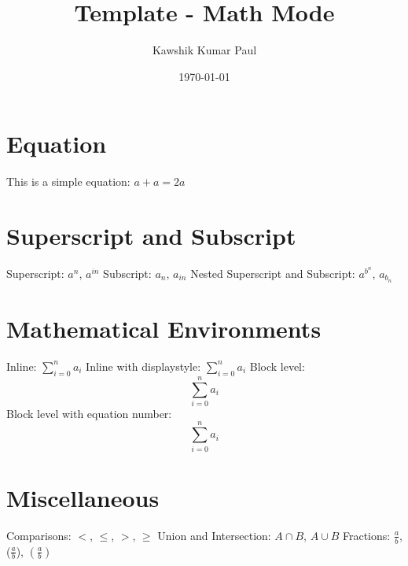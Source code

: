\documentclass[16pt, a4paper]{article} %
\title{Template - Math Mode}
\author{Kawshik Kumar Paul}
\date{\today}
\begin{document}
\maketitle
\tableofcontents %
\pagebreak %

\section{Equation}
This is a simple equation: $a + a = 2a$

\section{Superscript and Subscript}
Superscript: $a^n$, $a^{in}$
\newline
Subscript: $a_n$, $a_{in}$
\newline
Nested Superscript and Subscript: $a^{b^n}$, $a_{b_n}$

\section{Mathematical Environments}
Inline: $\sum_{i=0}^n a_i$
\newline
Inline with displaystyle: $\displaystyle\sum_{i=0}^n a_i$
\newline
Block level: $$\sum_{i=0}^n a_i$$
\newline
Block level with equation number:
\begin{equation}
\sum_{i=0}^n a_i
\end{equation}

\section{Miscellaneous}
Comparisons:
$ <$, $ \leq $, $ > $, $\geq $
\newline
Union and Intersection:
$A \cap B$, $A \cup B$
\newline
Fractions: $\frac{a}{b}$, ($\frac{a}{b}$), $\left(\frac{a}{b}\right)$
\end{document}
